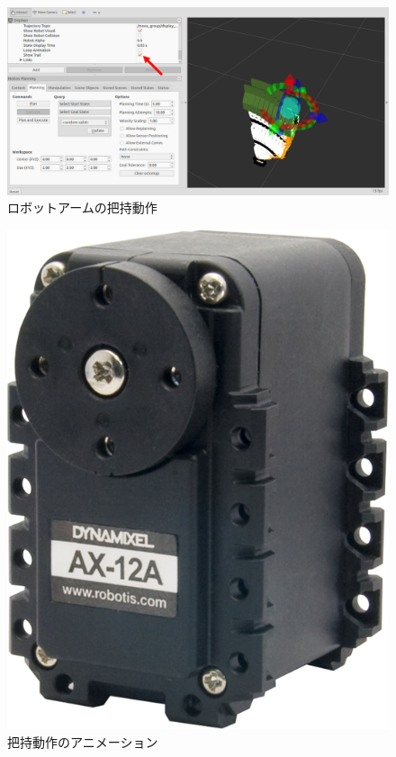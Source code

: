 \begin{figure}[ht]
  \centering
  \includegraphics[width=\columnwidth]{pictures/chapter11/pic_11_36.png}
  \caption{ロボットアームの把持動作}
\end{figure}

\begin{figure}[ht]
  \centering
  \includegraphics[width=\columnwidth]{pictures/chapter11/pic_11_37.png}
  \caption{把持動作のアニメーション}
\end{figure}

